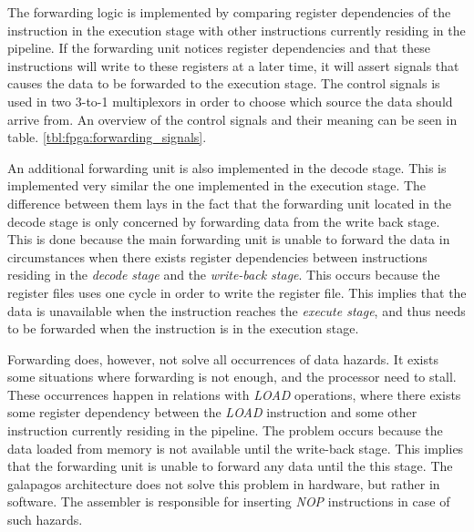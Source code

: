 The forwarding logic is implemented by comparing register dependencies of the instruction in the execution stage with other instructions currently residing in the pipeline. If the forwarding unit notices register dependencies and that these instructions will write to these registers at a later time, it will assert signals that causes the data to be forwarded to the execution stage. The control signals is used in two 3-to-1 multiplexors in order to choose which source the data should arrive from. An overview of the control signals and their meaning can be seen in table. \ref{tbl:fpga:forwarding_signals}.

An additional forwarding unit is also implemented in the decode stage. This is implemented very similar the one implemented in the execution stage. The difference between them lays in the fact that the forwarding unit located in the decode stage is only concerned by forwarding data from the write back stage. This is done because the main forwarding unit is unable to forward the data in circumstances when there exists register dependencies between instructions residing in the \emph{decode stage} and the \emph{write-back stage}. This occurs because the register files uses one cycle in order to write the register file. This implies that the data is unavailable when 
the instruction reaches the \emph{execute stage}, and thus needs to be forwarded when the instruction is in the execution stage. 


Forwarding does, however, not solve all occurrences of data hazards. It exists some situations where forwarding is not enough, and the processor need to stall. These occurrences happen in relations with \emph{LOAD} operations, where there exists some register dependency between the \emph{LOAD} instruction and some other instruction currently residing in the pipeline. The problem occurs because the data loaded from memory is not available until the write-back stage. This implies that the forwarding unit is unable to forward any data until the this stage. The galapagos architecture does not solve this problem in hardware, but rather in software. The assembler is responsible for inserting \emph{NOP} instructions in case of such hazards.  









